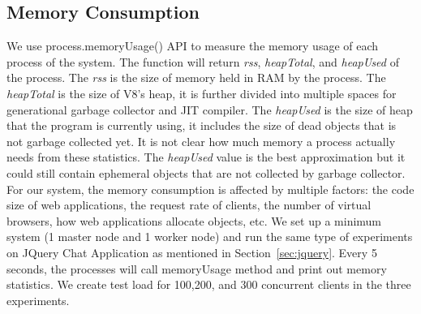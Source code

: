 \subsection{Memory Consumption}
We use \nodejs{} process.memoryUsage() API to measure the memory usage of each process
of the system.
The function will return \emph{rss}, \emph{heapTotal}, and \emph{heapUsed} of the process.
The \emph{rss} is the size of memory held in RAM by the process.
The \emph{heapTotal} is the size of V8's heap, it is further divided into 
multiple spaces for generational garbage collector and JIT compiler.
The \emph{heapUsed} is the size of heap that the program is currently using,
it includes the size of dead objects that is not garbage collected yet.
It is not clear how much memory a \nodejs{} process actually needs from these statistics.
The \emph{heapUsed} value is the best approximation but it could still contain
ephemeral objects that are not collected by garbage collector.
For our system, the memory consumption is affected by multiple factors:
the code size of web applications, the request rate of clients, 
the number of virtual browsers, how web applications allocate objects, etc.
We set up a minimum \cb{} system (1 master node and 1 worker node)
and run the same type of experiments on JQuery Chat Application as mentioned in Section~\ref{sec:jquery}.
Every 5 seconds, the \cb{} processes will call memoryUsage method and print out
memory statistics.
We create test load for 100,200, and 300 concurrent clients in the three experiments.

\memfig{}

